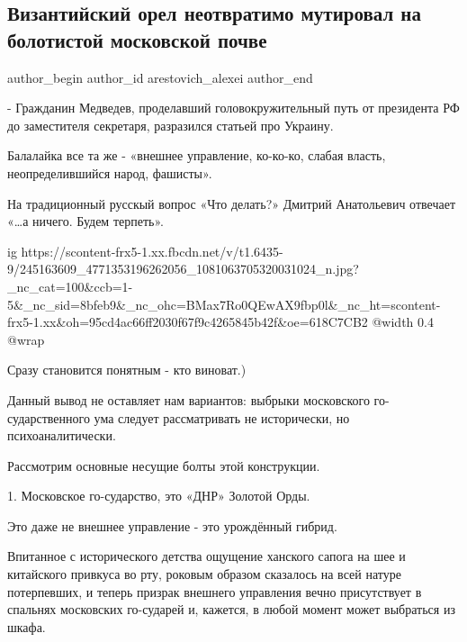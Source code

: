  
 
 
 
 
 
\subsection{Византийский орел неотвратимо мутировал на болотистой московской почве}
\label{sec:11_10_2021.fb.arestovich_alexei.1.statja_medvedeva_vizantia_orel}
 
\ifcmt
 author_begin
   author_id arestovich_alexei
 author_end
\fi

- Гражданин Медведев, проделавший головокружительный путь от президента РФ до
заместителя секретаря, разразился статьей про Украину.

Балалайка все та же - «внешнее управление,  ко-ко-ко, слабая власть,
неопределившийся народ, фашисты». 

На традиционный русскый вопрос «Что делать?» Дмитрий Анатольевич отвечает «…а
ничего. Будем терпеть».

\ifcmt
  ig https://scontent-frx5-1.xx.fbcdn.net/v/t1.6435-9/245163609_4771353196262056_1081063705320031024_n.jpg?_nc_cat=100&ccb=1-5&_nc_sid=8bfeb9&_nc_ohc=BMax7Ro0QEwAX9fbp0l&_nc_ht=scontent-frx5-1.xx&oh=95cd4ac66ff2030f67f9c4265845b42f&oe=618C7CB2
  @width 0.4
  @wrap 
\fi

Сразу становится понятным - кто виноват.)

Данный вывод не оставляет нам вариантов: выбрыки московского го-сударственного
ума следует рассматривать не исторически, но психоаналитически. 

Рассмотрим основные несущие болты этой конструкции.

1. Московское го-сударство, это «ДНР» Золотой Орды.

Это даже не внешнее управление - это урождённый гибрид. 

Впитанное с исторического детства ощущение ханского сапога на шее и китайского
привкуса во рту, роковым образом сказалось на всей натуре потерпевших, и теперь
призрак внешнего управления вечно присутствует в спальнях московских го-сударей
и, кажется, в любой момент может выбраться из шкафа.

